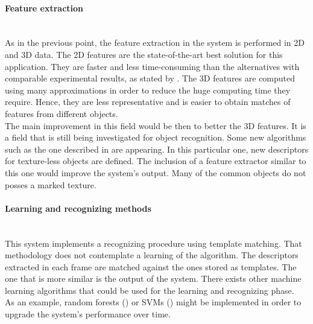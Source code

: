 	\paragraph{Feature extraction}\mbox{}\\

	As in the previous point, the feature extraction in the system is performed in 2D and 3D data. 
	The 2D features are the state-of-the-art best solution for this application. 
	They are faster and less time-consuming than the alternatives with comparable experimental results, as stated by \cite{Miksik2012}. 
	The 3D features are computed using many approximations in order to reduce the huge computing time they require. 
	Hence, they are less representative and is easier to obtain matches of features from different objects. 
	\\

	The main improvement in this field would be then to better the 3D features. 
	It is a field that is still being investigated for object recognition.
	Some new algorithms such as the one described in \cite{Hinterstoisser2012} are appearing. 
	In this particular one, new descriptors for texture-less objects are defined. 
	The inclusion of a feature extractor similar to this one would improve the system's output. 
	Many of the common objects do not posses a marked texture. 
	\\ 

	\paragraph{Learning and recognizing methods}\mbox{}\\

	This system implements a recognizing procedure using template matching. 
	That methodology does not contemplate a learning of the algorithm. 
	The descriptors extracted in each frame are matched against the ones stored as templates. 
	The one that is more similar is the output of the system. 
	There exists other machine learning algorithms that could be used for the learning and recognizing phase. 
	\\

	As an example, random forests (\cite{Gall2012}) or SVMs (\cite{Pontil1998}) might be implemented in order to upgrade the system's performance over time. 
